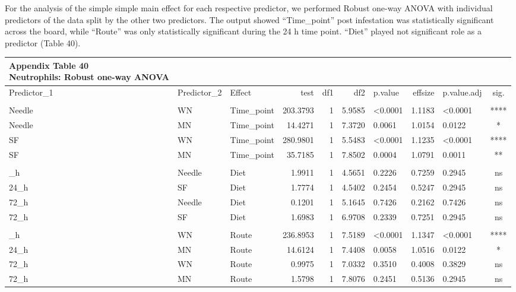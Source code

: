 \documentclass[
  12pt,
  letterpaper,
]{article}
\begin{document}
For the analysis of the simple simple main effect for each respective predictor, we performed Robust one-way ANOVA with individual predictors of the data split by the other two predictors. The output showed ``Time\_point'' post infestation was statistically significant across the board, while ``Route'' was only statistically significant during the 24 h time point. ``Diet'' played not significant role as a predictor (Table 40).

\begin{longtable}{lllrrrlrlc}
\caption*{
{\large \textbf{Appendix Table 40}} \\ 
{\small \textbf{Neutrophils: Robust one-way ANOVA}}
} \\ 
\toprule
Predictor\_1 & Predictor\_2 & Effect & test & df1 & df2 & p.value & effsize & p.value.adj & sig. \\ 
\midrule\addlinespace[2.5pt]
\multicolumn{10}{l}{Predictor: Time\_point} \\ 
\midrule\addlinespace[2.5pt]
Needle & WN & Time\_point & 203.3793 & 1 & 5.9585 & <0.0001 & 1.1183 & <0.0001 & **** \\ 
Needle & MN & Time\_point & 14.4271 & 1 & 7.3720 & 0.0061 & 1.0154 & 0.0122 & * \\ 
SF & WN & Time\_point & 280.9801 & 1 & 5.5483 & <0.0001 & 1.1235 & <0.0001 & **** \\ 
SF & MN & Time\_point & 35.7185 & 1 & 7.8502 & 0.0004 & 1.0791 & 0.0011 & ** \\ 
\midrule\addlinespace[2.5pt]
\multicolumn{10}{l}{Predictor: Diet} \\ 
\midrule\addlinespace[2.5pt]
24\_h & Needle & Diet & 1.9911 & 1 & 4.5651 & 0.2226 & 0.7259 & 0.2945 & ns \\ 
24\_h & SF & Diet & 1.7774 & 1 & 4.5402 & 0.2454 & 0.5247 & 0.2945 & ns \\ 
72\_h & Needle & Diet & 0.1201 & 1 & 5.1645 & 0.7426 & 0.2162 & 0.7426 & ns \\ 
72\_h & SF & Diet & 1.6983 & 1 & 6.9708 & 0.2339 & 0.7251 & 0.2945 & ns \\ 
\midrule\addlinespace[2.5pt]
\multicolumn{10}{l}{Predictor: Route} \\ 
\midrule\addlinespace[2.5pt]
24\_h & WN & Route & 236.8953 & 1 & 7.5189 & <0.0001 & 1.1347 & <0.0001 & **** \\ 
24\_h & MN & Route & 14.6124 & 1 & 7.4408 & 0.0058 & 1.0516 & 0.0122 & * \\ 
72\_h & WN & Route & 0.9975 & 1 & 7.0332 & 0.3510 & 0.4008 & 0.3829 & ns \\ 
72\_h & MN & Route & 1.5798 & 1 & 7.8076 & 0.2451 & 0.5136 & 0.2945 & ns \\ 
\bottomrule
\end{longtable}
\end{document}
